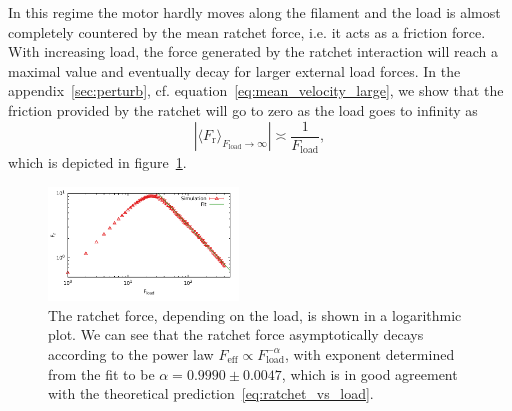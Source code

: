 \documentclass[aps,pre,twocolumn,showpacs,showkeys,superscriptaddress,floatfix]{revtex4-1}
\begin{document}
In this regime the motor hardly moves along the filament and the load is almost completely countered by the mean ratchet force, i.e. it acts as a friction force.
With increasing load, the force generated by the ratchet interaction will reach a maximal value and eventually decay for larger external load forces. 
In the appendix~\ref{sec:perturb}, cf. equation~\eqref{eq:mean_velocity_large}, we show that the friction provided by the ratchet will go to zero as the load goes to infinity as 
\begin{equation}
\left| \langle F_\text{r} \rangle_{F_\text{load}\rightarrow\infty} \right| \asymp \frac{1}{F_\text{load}} , 
\label{eq:ratchet_vs_load}
\end{equation} 
which is depicted in figure~\ref{fig:ratchet_force_decay}. 
\begin{figure}[t]
\centering
\includegraphics[width=0.45\textwidth,height=!]{ratchet_force_decay}
\caption{
\label{fig:ratchet_force_decay}
The ratchet force, depending on the load, is shown in a logarithmic plot. 
We can see that the ratchet force asymptotically decays according to the power law $F_\text{eff} \propto F_\text{load}^{-\alpha}$, 
with exponent determined from the fit to be $\alpha = 0.9990 \pm 0.0047$, 
which is in good agreement with the theoretical prediction~\eqref{eq:ratchet_vs_load}.
}
\end{figure}
\end{document}
